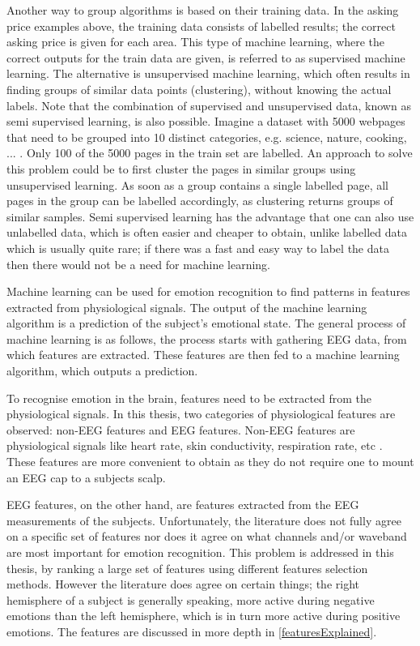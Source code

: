 \npar

Another way to group algorithms is based on their training data\citep{prml}. In the asking price examples above, the training data consists of labelled results; the correct asking price is given for each area. This type of machine learning, where the correct outputs for the train data are given, is referred to as supervised machine learning\citep{prml}. The alternative is unsupervised machine learning\citep{prml}, which often results in finding groups of similar data points (clustering), without knowing the actual labels. Note that the combination of supervised and unsupervised data, known as semi supervised learning, is also possible\citep{semiSup}. Imagine a dataset with 5000 webpages that need to be grouped into 10 distinct categories, e.g. science, nature, cooking, ... . Only 100 of the 5000 pages in the train set are labelled. An approach to solve this problem could be to first cluster the pages in similar groups using unsupervised learning. As soon as a group contains a single labelled page, all pages in the group can be labelled accordingly, as clustering returns groups of similar samples. Semi supervised learning has the advantage that one can also use unlabelled data, which is often easier and cheaper to obtain, unlike labelled data which is usually quite rare; if there was a fast and easy way to label the data then there would not be a need for machine learning.

\npar

Machine learning can be used for emotion recognition to find patterns in features extracted from physiological signals\citep{DEAP,ExtendedPaper}. The output of the machine learning algorithm is a prediction of the subject's emotional state. The general process of machine learning is as follows, the process starts with gathering EEG data, from which features are extracted. These features are then fed to a machine learning algorithm, which outputs a prediction.

\npar

To recognise emotion in the brain, features need to be extracted from the physiological signals. In this thesis, two categories of physiological features are observed: non-EEG features and EEG features. Non-EEG features are physiological signals like heart rate, skin conductivity, respiration rate, etc . These features are more convenient to obtain as they do not require one to mount an EEG cap to a subjects scalp. 

\npar

EEG features, on the other hand, are features extracted from the EEG measurements of the subjects. Unfortunately, the literature does not fully agree on a specific set of features nor does it agree on what channels and/or waveband are most important for emotion recognition. This problem is addressed in this thesis, by ranking a large set of features using different features selection methods. However the literature does agree on certain things; the right hemisphere of a subject is generally speaking, more active during negative emotions than the left hemisphere, which is in turn more active during positive emotions\cite{RealTimeEEGEmotion,EEGDatasets,killyPaper}. The features are discussed in more depth in \ref{featuresExplained}.

